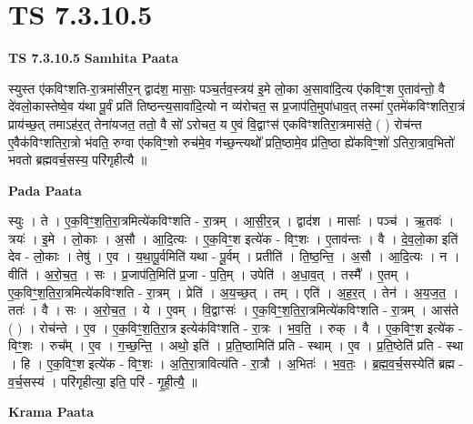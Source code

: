 \documentclass[17pt]{extarticle}
\begin{document}
\section{ TS 7.3.10.5 }

\textbf{TS 7.3.10.5 } \newline
\textbf{Samhita Paata} \newline

स्युस्त ए॑कविꣳशति-रा॒त्रमा॑सीर॒न् द्वाद॑श॒ मासाः॒ पञ्च॒र्तव॒स्त्रय॑ इ॒मे लो॒का अ॒सावा॑दि॒त्य ए॑कविꣳ॒॒श ए॒ताव॑न्तो॒ वै दे॑वलो॒कास्तेष्वे॒व य॑था पू॒र्वं प्रति॑ तिष्ठन्त्य॒सावा॑दि॒त्यो न व्य॑रोचत॒ स प्र॒जाप॑ति॒मुपा॑धाव॒त् तस्मा॑ ए॒तमे॑कविꣳशतिरा॒त्रं प्राय॑च्छ॒त् तमाऽह॑र॒त् तेना॑यजत॒ ततो॒ वै सो॑ ऽरोचत॒ य ए॒वं वि॒द्वाꣳस॑ एकविꣳशतिरा॒त्रमास॑ते॒ ( ) रोच॑न्त ए॒वैक॑विꣳशतिरा॒त्रो भ॑वति॒ रुग्वा ए॑कविꣳ॒॒शो रुच॑मे॒व ग॑च्छ॒न्त्यथो᳚ प्रति॒ष्ठामे॒व प्र॑ति॒ष्ठा ह्ये॑कविꣳ॒॒शो॑ ऽतिरा॒त्राव॒भितो॑ भवतो ब्रह्मवर्च॒सस्य॒ परि॑गृहीत्यै ॥ \newline

\textbf{Pada Paata} \newline

स्युः । ते । ए॒क॒विꣳ॒॒श॒ति॒रा॒त्रमित्ये॑कविꣳशति - रा॒त्रम् । आ॒सी॒र॒न्न् । द्वाद॑श । मासाः᳚ । पञ्च॑ । ऋ॒तवः॑ । त्रयः॑ । इ॒मे । लो॒काः । अ॒सौ । आ॒दि॒त्यः । ए॒क॒विꣳ॒॒श इत्ये॑क - विꣳ॒॒शः । ए॒ताव॑न्तः । वै । दे॒व॒लो॒का इति॑ देव - लो॒काः । तेषु॑ । ए॒व । य॒था॒पू॒र्वमिति॑ यथा - पू॒र्वम् । प्रतीति॑ । ति॒ष्ठ॒न्ति॒ । अ॒सौ । आ॒दि॒त्यः । न । वीति॑ । अ॒रो॒च॒त॒ । सः । प्र॒जाप॑ति॒मिति॑ प्र॒जा - प॒ति॒म् । उपेति॑ । अ॒धा॒व॒त् । तस्मै᳚ । ए॒तम् । ए॒क॒विꣳ॒॒श॒ति॒रा॒त्रमित्ये॑कविꣳशति - रा॒त्रम् । प्रेति॑ । अ॒य॒च्छ॒त् । तम् । एति॑ । अ॒ह॒र॒त् । तेन॑ । अ॒य॒ज॒त॒ । ततः॑ । वै । सः । अ॒रो॒च॒त॒ । ये । ए॒वम् । वि॒द्वाꣳसः॑ । ए॒क॒विꣳ॒॒श॒ति॒रा॒त्रमित्ये॑कविꣳशति - रा॒त्रम् । आस॑ते ( ) । रोच॑न्ते । ए॒व । ए॒क॒विꣳ॒॒श॒ति॒रा॒त्र इत्येक॑विꣳशति - रा॒त्रः । भ॒व॒ति॒ । रुक् । वै । ए॒क॒विꣳ॒॒श इत्ये॑क - विꣳ॒॒शः । रुच᳚म् । ए॒व । ग॒च्छ॒न्ति॒ । अथो॒ इति॑ । प्र॒ति॒ष्ठामिति॑ प्रति - स्थाम् । ए॒व । प्र॒ति॒ष्ठेति॑ प्रति - स्था । हि । ए॒क॒विꣳ॒॒श इत्ये॑क - विꣳ॒॒शः । अ॒ति॒रा॒त्रावित्य॑ति - रा॒त्रौ । अ॒भितः॑ । भ॒व॒तः॒ । ब्र॒ह्म॒व॒र्च॒सस्येति॑ ब्रह्म - व॒र्च॒सस्य॑ । परि॑गृहीत्या॒ इति॒ परि॑ - गृ॒ही॒त्यै॒ ॥  \newline


\textbf{Krama Paata} \newline
\end{document}
